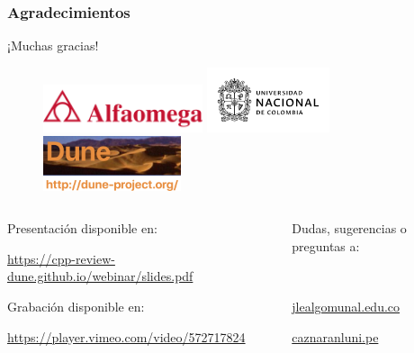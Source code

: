 \begin{frame}
	\frametitle{Agradecimientos}
	\begin{center}\Huge
		¡Muchas gracias!
	\end{center}
	\begin{figure}[ht!]
		\centering
		\href{https://www.alfaomega.com.mx}{\includegraphics[height=1.4cm]{alfaomega}}\quad
		\href{https://unal.edu.co}{\includegraphics[height=1.9cm]{unal}}\quad
		\href{https://dune-project.org}{\includegraphics[height=1.6cm]{dune-logo}}
	\end{figure}
	\vfill
	\begin{columns}
		\begin{column}{0.5\textwidth}
			\textcolor{c++reviewduneblue}{Presentación disponible en:}
			\begin{center}
				\href{https://cpp-review-dune.github.io/webinar/slides.pdf}{\url{https://cpp-review-dune.github.io/webinar/slides.pdf}}
			\end{center}
			\textcolor{c++reviewduneblue}{Grabación disponible en:}
			\begin{center}
				\href{https://player.vimeo.com/video/572717824}{\url{https://player.vimeo.com/video/572717824}}
			\end{center}
		\end{column}
		\hfill
		\begin{column}{0.5\textwidth}
			\begin{flushright}
				Dudas, sugerencias o preguntas a:

				\

				\href{mailto:jlealgom@unal.edu.co}{jlealgom\MVAt unal.edu.co}

				\href{mailto:caznaranl@uni.pe}{caznaranl\MVAt uni.pe}
			\end{flushright}
		\end{column}
	\end{columns}

\end{frame}